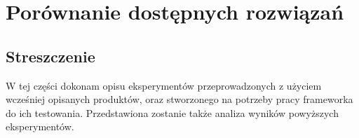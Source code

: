 \chapter{Porównanie dostępnych rozwiązań}

\section*{Streszczenie}
W tej części dokonam opisu eksperymentów przeprowadzonych z użyciem wcześniej opisanych produktów, oraz stworzonego na potrzeby pracy frameworka do ich testowania. 
Przedstawiona zostanie także analiza wyników powyższych eksperymentów.
